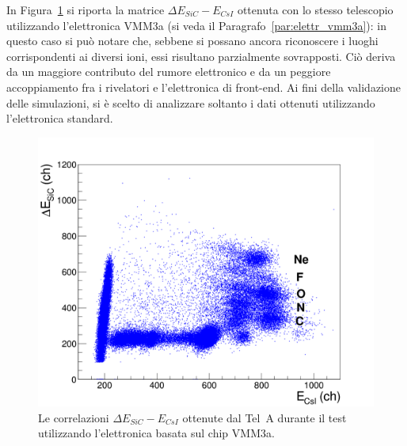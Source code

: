 


In Figura~\ref{fig:sic_csi_vmm3a} si riporta la  matrice $\Delta E_{SiC} - E_{CsI}$ ottenuta con lo stesso telescopio utilizzando l'elettronica VMM3a (si veda il Paragrafo~\ref{par:elettr_vmm3a}): in questo caso si può notare che, sebbene si possano ancora riconoscere i luoghi corrispondenti ai diversi ioni, essi risultano parzialmente sovrapposti.
Ciò deriva da un maggiore contributo del rumore elettronico e da un peggiore accoppiamento fra i rivelatori e l'elettronica di front-end.
Ai fini della validazione delle simulazioni, si è scelto di analizzare soltanto i dati ottenuti utilizzando l'elettronica standard.

\begin{figure} [!p]
	\centering
	\includegraphics[width=\textwidth, keepaspectratio]{Grafici_Tesi/Test/matrice_sic_csi_vmm3a.png}
	\caption{Le correlazioni $\Delta E_{SiC} - E_{CsI}$ ottenute dal Tel~A durante il test utilizzando l'elettronica basata sul chip VMM3a.} \label{fig:sic_csi_vmm3a}
\end{figure}

